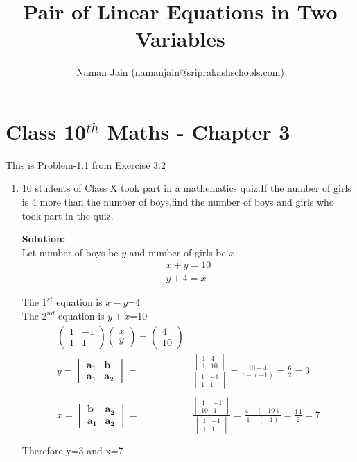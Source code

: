 \documentclass[10pt]{article}
\title{Pair of Linear Equations in Two Variables}
\author{Naman Jain  (namanjain@sriprakashschools.com)}
\newcommand{\myvec}[1]{\ensuremath{\begin{pmatrix}#1\end{pmatrix}}}
\newcommand{\mydet}[1]{\ensuremath{\begin{vmatrix}#1\end{vmatrix}}}
\newcommand{\solution}{\noindent \textbf{Solution: }}
\let\vec\mathbf
\begin{document}
\maketitle
\section*{Class 10$^{th}$ Maths - Chapter 3}
This is Problem-1.1 from Exercise 3.2
\begin{enumerate}
\item 10 students of Class X took part in a mathematics quiz.If the number of girls is 4 more than the number of boys,find the number of boys and girls who took part in the quiz.
	
\solution \\
Let number of boys be $y$ and number of girls be $x$.\\
\begin{align}
x+y=10\\
y+4=x
\end{align}

The $1^{st}$ equation is $x-y$=4\\
The $2^{nd}$ equation is $y+x$=10\\
\begin{align}
\myvec{1&-1\\1&1} \myvec{x\\y}=\myvec{4\\10}\\
y=\mydet{ \vec{a_1} & \vec{b}\\\vec{a_1} & \vec{a_2}} =&
\frac{\mydet{ 1 & 4\\1 & 10}}{\mydet{ 1 & -1\\1 & 1}}
=\frac{10-4}{1-(-1)}
=\frac{6}{2}
=3 \\ \\
x=\mydet{ \vec{b} & \vec{a_2}\\\vec{a_1} & \vec{a_2}} =&
\frac{\mydet{ 4 & -1\\10 & 1}}{\mydet{ 1 & -1\\1 & 1}}
=\frac{4-(-10)}{1-(-1)}
=\frac{14}{2}
=7\\ \\
\end{align}
Therefore  y=3 and x=7
\end{enumerate}
\end{document}
